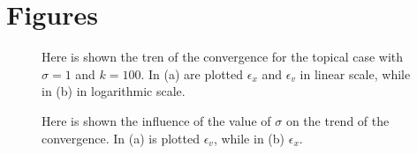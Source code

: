 \documentclass{article} %
\begin{document}
\section {Figures}
\begin{figure}[ht]
    \centering
    \caption{Here is shown the tren of the convergence for the topical case with $\sigma=1$ 
        and $k=100$. In (a) are plotted $\epsilon_x$ and $\epsilon_v$ in linear scale, while 
        in (b) in logarithmic scale.}
    \label{fig1}
\end{figure}
\begin{figure}[hb]
    \centering
    \caption{Here is shown the influence of the value of $\sigma$ on the trend of the 
        convergence. In (a) is plotted $\epsilon_v$, while in (b) $\epsilon_x$.}
    \label{fig2}
\end{figure}
\end{document}
